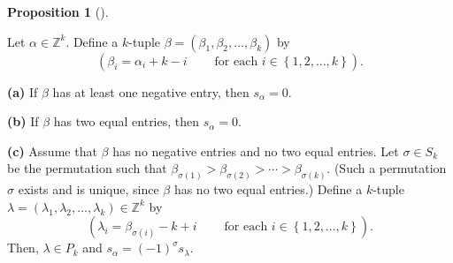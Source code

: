 \documentclass[numbers=enddot,12pt,final,onecolumn,notitlepage]{scrartcl}%
\theoremstyle{definition}
\newtheorem{prop}[theo]{Proposition}
\newenvironment{proposition}[1][]
{\begin{prop}[#1]\begin{leftbar}}
{\end{leftbar}\end{prop}}
\begin{document}
\begin{proposition}
\label{prop.non-part.schur-straighten}Let $\alpha\in\mathbb{Z}^{k}$. Define a
$k$-tuple $\beta=\left(  \beta_{1},\beta_{2},\ldots,\beta_{k}\right)  $ by%
\[
\left(  \beta_{i}=\alpha_{i}+k-i\ \ \ \ \ \ \ \ \ \ \text{for each }%
i\in\left\{  1,2,\ldots,k\right\}  \right)  .
\]


\textbf{(a)} If $\beta$ has at least one negative entry, then $s_{\alpha}=0$.

\textbf{(b)} If $\beta$ has two equal entries, then $s_{\alpha}=0$.

\textbf{(c)} Assume that $\beta$ has no negative entries and no two equal
entries. Let $\sigma\in S_{k}$ be the permutation such that $\beta
_{\sigma\left(  1\right)  }>\beta_{\sigma\left(  2\right)  }>\cdots
>\beta_{\sigma\left(  k\right)  }$. (Such a permutation $\sigma$ exists and is
unique, since $\beta$ has no two equal entries.) Define a $k$-tuple
$\lambda=\left(  \lambda_{1},\lambda_{2},\ldots,\lambda_{k}\right)
\in\mathbb{Z}^{k}$ by%
\[
\left(  \lambda_{i}=\beta_{\sigma\left(  i\right)  }%
-k+i\ \ \ \ \ \ \ \ \ \ \text{for each }i\in\left\{  1,2,\ldots,k\right\}
\right)  .
\]
Then, $\lambda\in P_{k}$ and $s_{\alpha}=\left(  -1\right)  ^{\sigma
}s_{\lambda}$.
\end{proposition}
\end{document}
